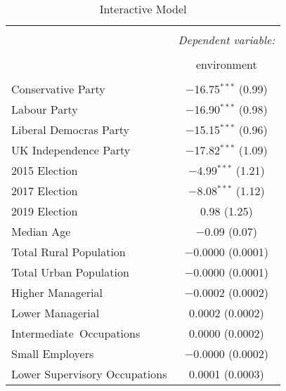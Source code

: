 \documentclass[12pt,letterpaper]{article}
\renewcommand{\headrulewidth}{0pt} %
\begin{document}
\fancypagestyle{special}{%
	\fancyhf{} %
	\renewcommand{\headrulewidth}{0pt} %
	\renewcommand{\footrulewidth}{0pt} %
	\fancyfoot[R]{\thepage} %
}

\thispagestyle{special}






\begin{table}[H] \centering 
	\caption{Interactive Model} 
	\label{tab:interactive} 
	\footnotesize 
	\begin{tabular}{@{\extracolsep{5pt}}lc} 
		\\[-1.8ex]\hline 
		\hline \\[-1.8ex] 
		& \multicolumn{1}{c}{\textit{Dependent variable:}} \\ 
		\cline{2-2} 
		\\[-1.8ex] & environment \\ 
		\hline \\[-1.8ex] 
		Conservative Party & $-$16.75$^{***}$ (0.99) \\ 
		Labour Party & $-$16.90$^{***}$ (0.98) \\ 
		Liberal Democras Party & $-$15.15$^{***}$ (0.96) \\ 
		UK Independence Party & $-$17.82$^{***}$ (1.09) \\ 
		2015 Election & $-$4.99$^{***}$ (1.21) \\ 
		2017 Election& $-$8.08$^{***}$ (1.12) \\ 
		2019 Election& 0.98 (1.25) \\ 
		Median Age & $-$0.09 (0.07) \\ 
		Total Rural Population & $-$0.0000 (0.0001) \\ 
		Total Urban Population & $-$0.0000 (0.0001) \\ 
		Higher Managerial & $-$0.0002 (0.0002) \\ 
		Lower Managerial & 0.0002 (0.0002) \\ 
		Intermediate\ Occupations & 0.0000 (0.0002) \\ 
		Small Employers & $-$0.0000 (0.0002) \\ 
		Lower Supervisory Occupations & 0.0001 (0.0003) \\ 

\end{tabular}
\end{table}
\end{document}
